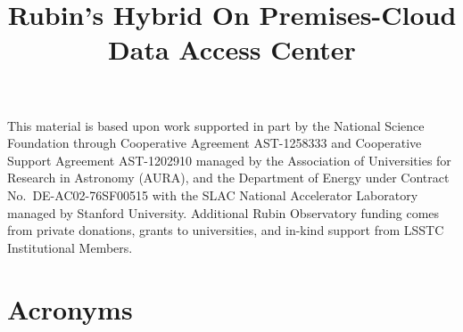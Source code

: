 \documentclass[]{spie}
\begin{document}

\title{Rubin's Hybrid On Premises-Cloud  Data Access Center}

\maketitle




\acknowledgments

This material is based upon work supported in part by the National Science Foundation through Cooperative Agreement AST-1258333 and Cooperative Support Agreement AST-1202910 managed by the Association of Universities for Research in Astronomy (AURA), and the Department of Energy under Contract No.\ DE-AC02-76SF00515 with the SLAC National Accelerator Laboratory managed by Stanford University.
Additional Rubin Observatory funding comes from private donations, grants to universities, and in-kind support from LSSTC Institutional Members.

\appendix



\section{Acronyms} \label{sec:acronyms}

\end{document}
